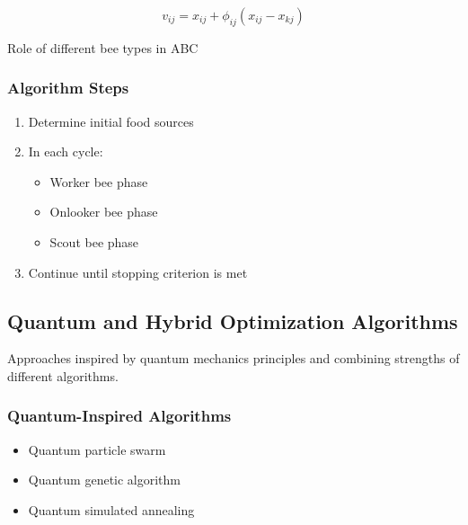 \begin{equation}
v_{ij} = x_{ij} + \phi_{ij}(x_{ij} - x_{kj})
\end{equation}

\begin{marginfigure}
\centering
{}
\caption{Role of different bee types in ABC}
\label{fig:abc_bees}
\end{marginfigure}

\subsubsection{Algorithm Steps}
\begin{enumerate}
    \item Determine initial food sources
    \item In each cycle:
        \begin{itemize}
            \item Worker bee phase
            \item Onlooker bee phase
            \item Scout bee phase
        \end{itemize}
    \item Continue until stopping criterion is met
\end{enumerate}

\subsection{Quantum and Hybrid Optimization Algorithms}
Approaches inspired by quantum mechanics principles and combining strengths of different algorithms.

\subsubsection{Quantum-Inspired Algorithms}
\begin{itemize}
    \item Quantum particle swarm
    \item Quantum genetic algorithm
    \item Quantum simulated annealing
\end{itemize}

